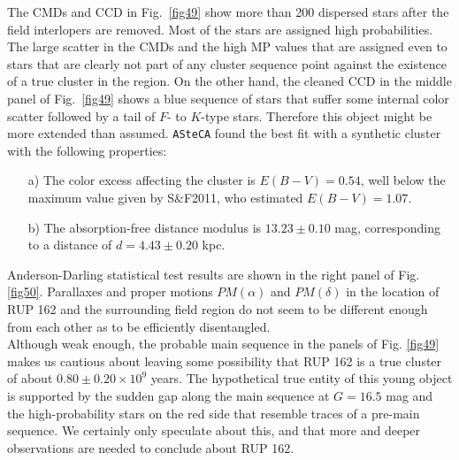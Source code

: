 \documentclass[draft]{aa}
\begin{document}
The CMDs and CCD in Fig.~\ref{fig49}
show more than 200 dispersed stars after the field interlopers are removed.
Most of the stars are assigned high probabilities. The large scatter in the
CMDs and the high MP values that are assigned even
to stars that are clearly not part of any cluster sequence point against the
existence of a true cluster in the region.
On the other hand, the cleaned CCD in the middle panel of Fig.~\ref{fig49} shows a blue
sequence of stars that suffer some internal color scatter followed by a tail of
$F$- to $K$-type stars. Therefore this object might be more extended than
assumed. \texttt{ASteCA} found the best fit with a synthetic cluster with
the following properties:

\begin{itemize}
\item [a)] The color excess affecting the cluster is $E(B-V)=0.54$, well
below the maximum value given by S\&F2011, who estimated $E(B-V)=1.07$.
\item [b)] The absorption-free distance modulus is $13.23\pm0.10$ mag,
corresponding to a distance of $d=4.43\pm0.20$ kpc.
\end{itemize}

Anderson-Darling statistical test results are shown in the right panel of Fig. \ref{fig50}. Parallaxes and proper motions $PM(\alpha)$ and $PM(\delta)$ in the
location of RUP 162 and the surrounding field region do not seem to be
different enough from each other as to be efficiently disentangled.\\

Although weak enough, the probable main sequence in the 
panels of Fig. \ref{fig49} makes us cautious about leaving some possibility that RUP 162 is a true cluster of about $0.80\pm0.20\times10^9$ years.
The hypothetical true entity of this young
object is supported by the sudden gap along the main sequence at $G=16.5$ mag
and the high-probability stars on the red side that resemble traces of
a pre-main sequence. We certainly only speculate about this, and that
more and deeper observations are needed to conclude about
RUP 162.
\end{document}
